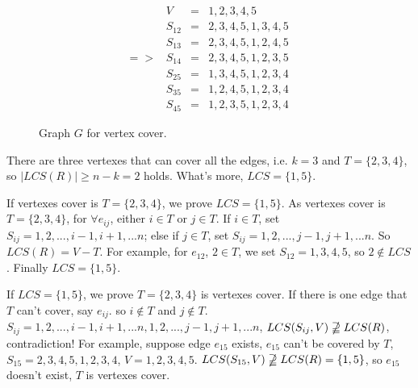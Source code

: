 \documentclass[a4paper,12pt]{article}
\begin{document}
\begin{figure}[!ht]
\centering
\parbox{1in}
{
}
\qquad
\begin{minipage}{3in}
\[
=>~~
\begin{array}{ccl}
V&=&1,2,3,4,5\\
S_{12}&=&2,3,4,5,1,3,4,5\\
S_{13}&=&2,3,4,5,1,2,4,5\\
S_{14}&=&2,3,4,5,1,2,3,5\\
S_{25}&=&1,3,4,5,1,2,3,4\\
S_{35}&=&1,2,4,5,1,2,3,4\\
S_{45}&=&1,2,3,5,1,2,3,4
\end{array} \nonumber
\]
\end{minipage}
\caption{Graph $G$ for vertex cover.}
\end{figure}

There are three vertexes that can cover all the edges, i.e. $k=3$ and $T=\{2,3,4\}$, so $|LCS(R)|\geq n-k=2$ holds. What's more, $LCS=\{1,5\}$.

If vertexes cover is $T=\{2,3,4\}$, we prove $LCS=\{1,5\}$. As vertexes cover is $T=\{2,3,4\}$, for $\forall e_{ij}$, either $i\in T$ or $j\in T$. If $i\in T$, set $S_{ij}=1,2,...,i-1,i+1,...n$; else if $j\in T$, set $S_{ij}=1,2,...,j-1,j+1,...n$. So $LCS(R)=V-T$. For example, for $e_{12}$, $2\in T$, we set $S_{12}=1,3,4,5$, so $2\notin LCS$. Finally $LCS=\{1,5\}$.

If $LCS=\{1,5\}$, we prove $T=\{2,3,4\}$ is vertexes cover. If there is one edge that $T$ can't cover, say $e_{ij}$. so $i\notin T$ and $j\notin T$. $S_{ij}=1,2,...,i-1,i+1,...n,1,2,...,j-1,j+1,...n$, $LCS(S_{ij},V)\nsupseteqq LCS(R)$, contradiction! For example, suppose edge $e_{15}$ exists, $e_{15}$ can't be covered by $T$, $S_{15}=2,3,4,5,1,2,3,4$, $V=1,2,3,4,5$. $LCS(S_{15},V)\nsupseteqq LCS(R)=\{1,5\}$, so $e_{15}$ doesn't exist, $T$ is vertexes cover.
\end{document}
